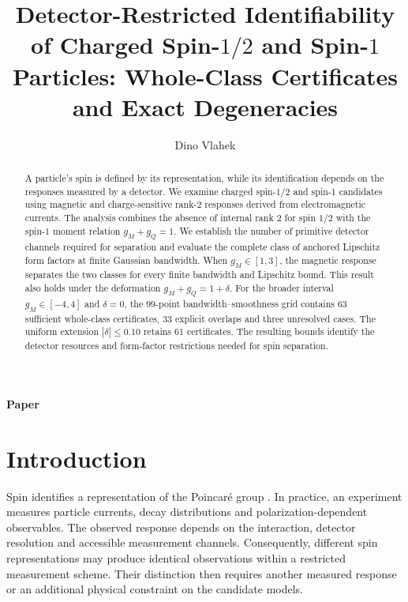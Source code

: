 \documentclass[12pt]{iopjournal}
\theoremstyle{definition}
\theoremstyle{remark}
\renewcommand{\articletype}[1]{\par\noindent\textsf{\textbf{#1}}\par\medskip}
\begin{document}
\articletype{Paper}

\title{Detector-Restricted Identifiability of Charged Spin-$1/2$ and Spin-$1$ Particles: Whole-Class Certificates and Exact Degeneracies}

\author{Dino Vlahek}\par
{}
\par{}\par
\par{}

\begin{abstract}
A particle's spin is defined by its representation, while its identification depends on the responses measured by a detector. We examine charged spin-$1/2$ and spin-$1$ candidates using magnetic and charge-sensitive rank-$2$ responses derived from electromagnetic currents. The analysis combines the absence of internal rank $2$ for spin $1/2$ with the spin-$1$ moment relation $g_M+g_Q=1$. We establish the number of primitive detector channels required for separation and evaluate the complete class of anchored Lipschitz form factors at finite Gaussian bandwidth. When $g_M\in[1,3]$, the magnetic response separates the two classes for every finite bandwidth and Lipschitz bound. This result also holds under the deformation $g_M+g_Q=1+\delta$. For the broader interval $g_M\in[-4,4]$ and $\delta=0$, the $99$-point bandwidth--smoothness grid contains $63$ sufficient whole-class certificates, $33$ explicit overlaps and three unresolved cases. The uniform extension $|\delta|\le0.10$ retains $61$ certificates. The resulting bounds identify the detector resources and form-factor restrictions needed for spin separation.
\end{abstract}

\section{Introduction}
\label{sec:introduction}

Spin identifies a representation of the Poincar\'e group \cite{Wigner1939}. In practice, an experiment measures particle currents, decay distributions and polarization-dependent observables. The observed response depends on the interaction, detector resolution and accessible measurement channels. Consequently, different spin representations may produce identical observations within a restricted measurement scheme. Their distinction then requires another measured response or an additional physical constraint on the candidate models.
\end{document}
